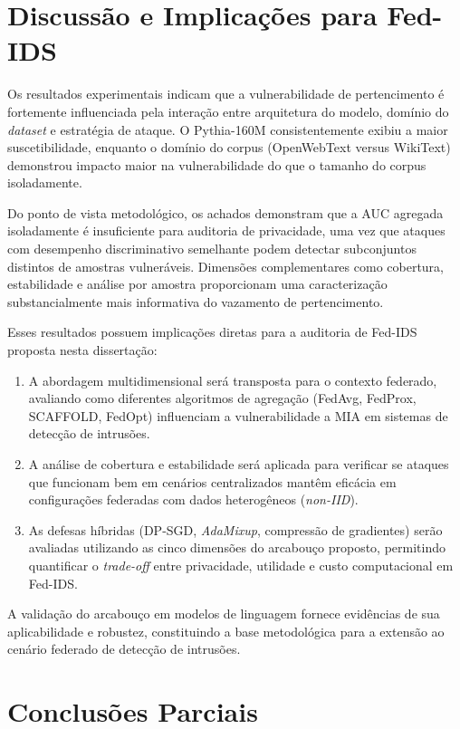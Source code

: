 \documentclass[
	12pt,				%
	openright,			%
	oneside,			%
	a4paper,			%
	english,			%
	french,				%
	spanish,			%
	brazil,				%
	]{abntex2}
\begin{document}
\section{Discussão e Implicações para Fed-IDS}

Os resultados experimentais indicam que a vulnerabilidade de pertencimento é fortemente influenciada pela interação entre arquitetura do modelo, domínio do \textit{dataset} e estratégia de ataque. O Pythia-160M consistentemente exibiu a maior suscetibilidade, enquanto o domínio do corpus (OpenWebText versus WikiText) demonstrou impacto maior na vulnerabilidade do que o tamanho do corpus isoladamente.

Do ponto de vista metodológico, os achados demonstram que a AUC agregada isoladamente é insuficiente para auditoria de privacidade, uma vez que ataques com desempenho discriminativo semelhante podem detectar subconjuntos distintos de amostras vulneráveis. Dimensões complementares como cobertura, estabilidade e análise por amostra proporcionam uma caracterização substancialmente mais informativa do vazamento de pertencimento.

Esses resultados possuem implicações diretas para a auditoria de Fed-IDS proposta nesta dissertação:

\begin{enumerate}[label=(\roman*)]
    \item A abordagem multidimensional será transposta para o contexto federado, avaliando como diferentes algoritmos de agregação (FedAvg, FedProx, SCAFFOLD, FedOpt) influenciam a vulnerabilidade a MIA em sistemas de detecção de intrusões.
    \item A análise de cobertura e estabilidade será aplicada para verificar se ataques que funcionam bem em cenários centralizados mantêm eficácia em configurações federadas com dados heterogêneos (\textit{non-IID}).
    \item As defesas híbridas (DP-SGD, \textit{AdaMixup}, compressão de gradientes) serão avaliadas utilizando as cinco dimensões do arcabouço proposto, permitindo quantificar o \textit{trade-off} entre privacidade, utilidade e custo computacional em Fed-IDS.
\end{enumerate}

A validação do arcabouço em modelos de linguagem fornece evidências de sua aplicabilidade e robustez, constituindo a base metodológica para a extensão ao cenário federado de detecção de intrusões.


\section{Conclusões Parciais}
\label{sec:conclusoes}
\end{document}
